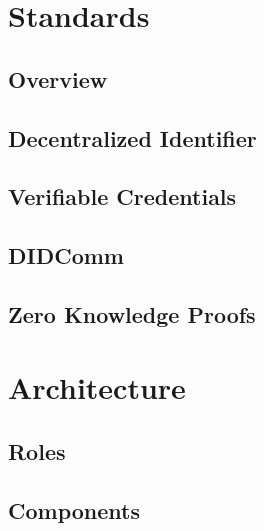	\section{Standards}
	    \subsection{Overview}
	    \subsection{Decentralized Identifier}
	    \subsection{Verifiable Credentials}
		\subsection{DIDComm}
		\subsection{Zero Knowledge Proofs}
	\section{Architecture}
	\subsection{Roles}
	\subsection{Components}